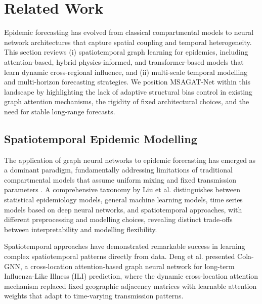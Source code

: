 \documentclass[final,1p,times]{elsarticle}
\begin{document}
\section{Related Work}
\label{sec:related_work} 

Epidemic forecasting has evolved from classical compartmental models to neural network architectures that capture spatial coupling and temporal heterogeneity. This section reviews (i) spatiotemporal graph learning for epidemics, including attention-based, hybrid physics-informed, and transformer-based models that learn dynamic cross-regional influence, and (ii) multi-scale temporal modelling and multi-horizon forecasting strategies. We position MSAGAT-Net within this landscape by highlighting the lack of adaptive structural bias control in existing graph attention mechanisms, the rigidity of fixed architectural choices, and the need for stable long-range forecasts.


\subsection{Spatiotemporal Epidemic Modelling}
The application of graph neural networks to epidemic forecasting has emerged as a dominant paradigm, fundamentally addressing limitations of traditional compartmental models that assume uniform mixing and fixed transmission parameters \cite{lijingwangCausalGNNCausalBasedGraph2022}. A comprehensive taxonomy by Liu et al. \cite{liuReviewGraphNeural2024a, wang_deepest_2024} distinguishes between statistical epidemiology models, general machine learning models, time series models based on deep neural networks, and spatiotemporal approaches, with different preprocessing and modelling choices, revealing distinct trade-offs between interpretability and modelling flexibility.

Spatiotemporal approaches have demonstrated remarkable success in learning complex spatiotemporal patterns directly from data. Deng et al. \cite{dengColaGNNCrosslocationAttention2020a} presented Cola-GNN, a cross-location attention-based graph neural network for long-term Influenza-Like Illness (ILI) prediction, where the dynamic cross-location attention mechanism replaced fixed geographic adjacency matrices with learnable attention weights that adapt to time-varying transmission patterns.
\end{document}
